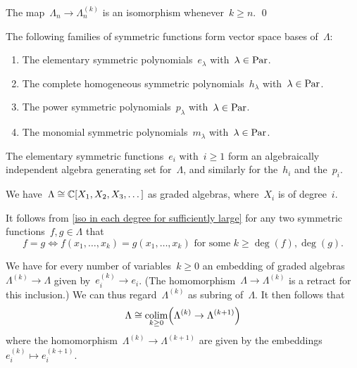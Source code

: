 \documentclass[a4paper,11pt]{scrartcl}
\begin{document}
\begin{corollary}
  \label{iso in each degree for sufficiently large}
  The map~$\Lambda_n \to \Lambda^{(k)}_n$ is an isomorphism whenever~$k \geq n$.
  \qed
\end{corollary}

\begin{corollary}
  The following families of symmetric functions form vector space bases of~$\Lambda$:
  \begin{enumerate}
    \item
      The elementary symmetric polynomials~$e_\lambda$ with~$\lambda \in \mathrm{Par}$.
    \item
      The complete homogeneous symmetric polynomials~$h_\lambda$ with~$\lambda \in \mathrm{Par}$.
    \item
      The power symmetric polynomials~$p_\lambda$ with~$\lambda \in \mathrm{Par}$.
    \item
      The monomial symmetric polynomials~$m_\lambda$ with~$\lambda \in \mathrm{Par}$.
  \end{enumerate}
\end{corollary}

\begin{corollary}
  The elementary symmetric functions~$e_i$ with~$i \geq 1$ form an algebraically independent algebra generating set for~$\Lambda$, and similarly for the~$h_i$ and the~$p_i$.
\end{corollary}

\begin{corollary}
  We have~$\Lambda \cong \mathbb{C}[X_1, X_2, X_3, \dotsc]$ as graded algebras, where~$X_i$ is of degree~$i$.
\end{corollary}

\begin{remark}
  It follows from \cref{iso in each degree for sufficiently large} for any two symmetric functions~$f, g \in \Lambda$ that
  \[
    f = g
    \iff
    \text{$f(x_1, \dotsc, x_k) = g(x_1, \dotsc, x_k)$ for some~$k \geq \deg(f), \deg(g)$.}
  \]
\end{remark}

\begin{remark}
  We have for every number of variables~$k \geq 0$ an embedding of graded algebras~$\Lambda^{(k)} \to \Lambda$ given by~$e^{(k)}_i \to e_i$.
  (The homomorphism~$\Lambda \to \Lambda^{(k)}$ is a retract for this inclusion.)
  We can thus regard~$\Lambda^{(k)}$ as subring of~$\Lambda$.
  It then follows that
  \[
    \Lambda
    \cong
    \operatorname*{colim}_{k \geq 0}
    \Bigl(
      \Lambda^{(k)} \to \Lambda^{(k+1)}
    \Bigr)
  \]
  where the homomorphism~$\Lambda^{(k)} \to \Lambda^{(k+1)}$ are given by the embeddings~$e^{(k)}_i \mapsto e^{(k+1)}_i$.
\end{remark}
\end{document}
